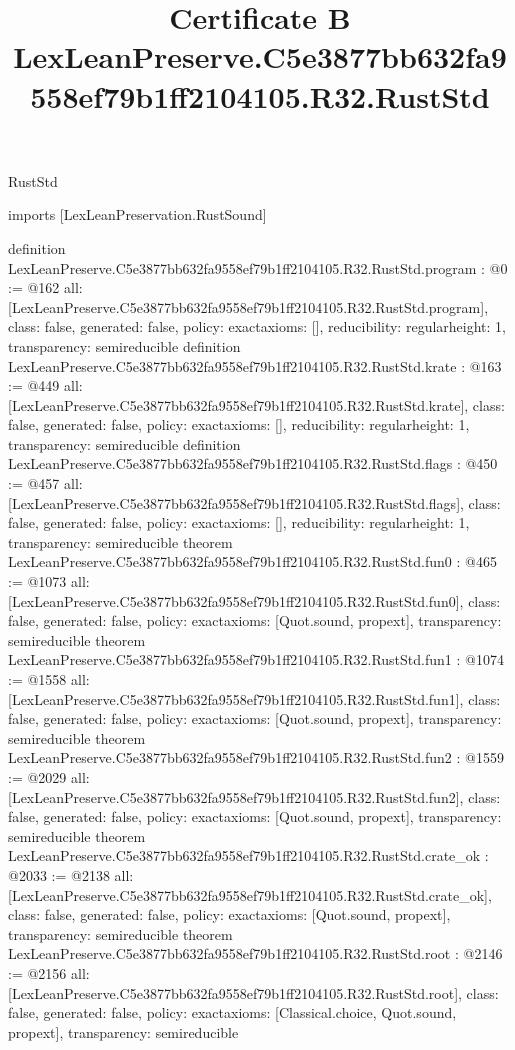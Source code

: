 \begin{lexlean}{RustStd}
\title{Certificate B LexLeanPreserve.C5e3877bb632fa9558ef79b1ff2104105.R32.RustStd}
\begin{coremodule}
imports [LexLeanPreservation.RustSound]

definition LexLeanPreserve.C5e3877bb632fa9558ef79b1ff2104105.R32.RustStd.program : @0 := @162 {
  all: [LexLeanPreserve.C5e3877bb632fa9558ef79b1ff2104105.R32.RustStd.program],
  class: false,
  generated: false,
  policy: exact{axioms: []},
  reducibility: regular{height: 1},
  transparency: semireducible
}
definition LexLeanPreserve.C5e3877bb632fa9558ef79b1ff2104105.R32.RustStd.krate : @163 := @449 {
  all: [LexLeanPreserve.C5e3877bb632fa9558ef79b1ff2104105.R32.RustStd.krate],
  class: false,
  generated: false,
  policy: exact{axioms: []},
  reducibility: regular{height: 1},
  transparency: semireducible
}
definition LexLeanPreserve.C5e3877bb632fa9558ef79b1ff2104105.R32.RustStd.flags : @450 := @457 {
  all: [LexLeanPreserve.C5e3877bb632fa9558ef79b1ff2104105.R32.RustStd.flags],
  class: false,
  generated: false,
  policy: exact{axioms: []},
  reducibility: regular{height: 1},
  transparency: semireducible
}
theorem LexLeanPreserve.C5e3877bb632fa9558ef79b1ff2104105.R32.RustStd.fun0 : @465 := @1073 {
  all: [LexLeanPreserve.C5e3877bb632fa9558ef79b1ff2104105.R32.RustStd.fun0],
  class: false,
  generated: false,
  policy: exact{axioms: [Quot.sound, propext]},
  transparency: semireducible
}
theorem LexLeanPreserve.C5e3877bb632fa9558ef79b1ff2104105.R32.RustStd.fun1 : @1074 := @1558 {
  all: [LexLeanPreserve.C5e3877bb632fa9558ef79b1ff2104105.R32.RustStd.fun1],
  class: false,
  generated: false,
  policy: exact{axioms: [Quot.sound, propext]},
  transparency: semireducible
}
theorem LexLeanPreserve.C5e3877bb632fa9558ef79b1ff2104105.R32.RustStd.fun2 : @1559 := @2029 {
  all: [LexLeanPreserve.C5e3877bb632fa9558ef79b1ff2104105.R32.RustStd.fun2],
  class: false,
  generated: false,
  policy: exact{axioms: [Quot.sound, propext]},
  transparency: semireducible
}
theorem LexLeanPreserve.C5e3877bb632fa9558ef79b1ff2104105.R32.RustStd.crate_ok : @2033 := @2138 {
  all: [LexLeanPreserve.C5e3877bb632fa9558ef79b1ff2104105.R32.RustStd.crate_ok],
  class: false,
  generated: false,
  policy: exact{axioms: [Quot.sound, propext]},
  transparency: semireducible
}
theorem LexLeanPreserve.C5e3877bb632fa9558ef79b1ff2104105.R32.RustStd.root : @2146 := @2156 {
  all: [LexLeanPreserve.C5e3877bb632fa9558ef79b1ff2104105.R32.RustStd.root],
  class: false,
  generated: false,
  policy: exact{axioms: [Classical.choice, Quot.sound, propext]},
  transparency: semireducible
}


\end{coremodule}
\end{lexlean}
